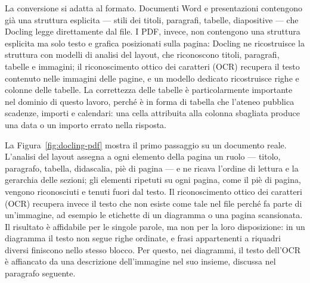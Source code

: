 La conversione si adatta al formato. Documenti Word e presentazioni contengono già una struttura esplicita ---
stili dei titoli, paragrafi, tabelle, diapositive --- che Docling legge direttamente dal file. I PDF, invece, non
contengono una struttura esplicita ma solo testo e grafica posizionati sulla pagina: Docling ne ricostruisce la
struttura con modelli di analisi del layout, che riconoscono titoli, paragrafi, tabelle e immagini; il
riconoscimento ottico dei caratteri (OCR) recupera il testo contenuto nelle immagini delle pagine, e un modello
dedicato ricostruisce righe e colonne delle tabelle. La correttezza delle tabelle è particolarmente importante nel
dominio di questo lavoro, perché è in forma di tabella che l'ateneo pubblica scadenze, importi e calendari: una
cella attribuita alla colonna sbagliata produce una data o un importo errato nella risposta.

La Figura~\ref{fig:docling-pdf} mostra il primo passaggio su un documento reale. L'analisi del layout assegna a
ogni elemento della pagina un ruolo --- titolo, paragrafo, tabella, didascalia, piè di pagina --- e ne ricava
l'ordine di lettura e la gerarchia delle sezioni; gli elementi ripetuti su ogni pagina, come il piè di pagina,
vengono riconosciuti e tenuti fuori dal testo. Il riconoscimento ottico dei caratteri (OCR) recupera invece il testo
che non esiste come tale nel file perché fa parte di un'immagine, ad esempio le etichette di un diagramma o una
pagina scansionata. Il risultato è affidabile per le singole parole, ma non per la loro disposizione: in un
diagramma il testo non segue righe ordinate, e frasi appartenenti a riquadri diversi finiscono nello stesso blocco.
Per questo, nei diagrammi, il testo dell'OCR è affiancato da una descrizione dell'immagine nel suo insieme,
discussa nel paragrafo seguente.

